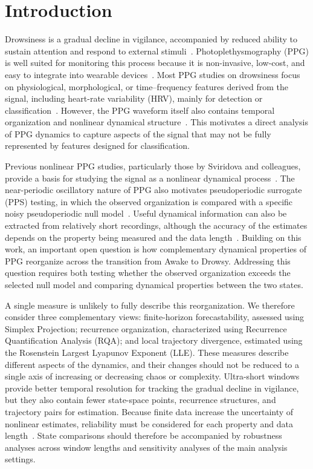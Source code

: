 \section{Introduction}

Drowsiness is a gradual decline in vigilance, accompanied by reduced ability to sustain attention and respond to external stimuli~\cite{peker2026,el2026}. Photoplethysmography (PPG) is well suited for monitoring this process because it is non-invasive, low-cost, and easy to integrate into wearable devices~\cite{charlton2023}. Most PPG studies on drowsiness focus on physiological, morphological, or time--frequency features derived from the signal, including heart-rate variability (HRV), mainly for detection or classification~\cite{amidei2021,cao2023,alarnaout2025,yu2024}. However, the PPG waveform itself also contains temporal organization and nonlinear dynamical structure~\cite{de2020,sviridova2015}. This motivates a direct analysis of PPG dynamics to capture aspects of the signal that may not be fully represented by features designed for classification.

Previous nonlinear PPG studies, particularly those by Sviridova and colleagues, provide a basis for studying the signal as a nonlinear dynamical process~\cite{sviridova2015}. The near-periodic oscillatory nature of PPG also motivates pseudoperiodic surrogate (PPS) testing, in which the observed organization is compared with a specific noisy pseudoperiodic null model~\cite{sviridova2018}. Useful dynamical information can also be extracted from relatively short recordings, although the accuracy of the estimates depends on the property being measured and the data length~\cite{sviridova2022}. Building on this work, an important open question is how complementary dynamical properties of PPG reorganize across the transition from Awake to Drowsy. Addressing this question requires both testing whether the observed organization exceeds the selected null model and comparing dynamical properties between the two states.

A single measure is unlikely to fully describe this reorganization. We therefore consider three complementary views: finite-horizon forecastability, assessed using Simplex Projection; recurrence organization, characterized using Recurrence Quantification Analysis (RQA); and local trajectory divergence, estimated using the Rosenstein Largest Lyapunov Exponent (LLE). These measures describe different aspects of the dynamics, and their changes should not be reduced to a single axis of increasing or decreasing chaos or complexity. Ultra-short windows provide better temporal resolution for tracking the gradual decline in vigilance, but they also contain fewer state-space points, recurrence structures, and trajectory pairs for estimation. Because finite data increase the uncertainty of nonlinear estimates, reliability must be considered for each property and data length~\cite{shaffer2020,sviridova2022}. State comparisons should therefore be accompanied by robustness analyses across window lengths and sensitivity analyses of the main analysis settings.

